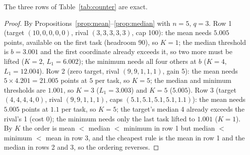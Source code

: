 \begin{proposition}\label{prop:counter}
The three rows of Table~\ref{tab:counter} are exact.
\end{proposition}
\begin{proof}
By Propositions~\ref{prop:mean}--\ref{prop:median} with $n=5$, $q=3$. Row 1 (target $(10,0,0,0,0)$, rival $(3,3,3,3,3)$, cap 100): the mean needs $5.005$ points, available on the first task (headroom 90), so $K=1$; the median threshold is $b=3.001$ and the first coordinate already exceeds it, so two more must be lifted ($K=2$, $L_1=6.002$); the minimum needs all four others at $b$ ($K=4$, $L_1=12.004$). Row 2 (zero target, rival $(9,9,1,1,1)$, gain 5): the mean needs $5\times4.201=21.005$ points at $5$ per task, so $K=5$; the median and minimum thresholds are $1.001$, so $K=3$ ($L_1=3.003$) and $K=5$ ($5.005$). Row 3 (target $(4,4,4,4,0)$, rival $(9,9,1,1,1)$, caps $(5.1,5.1,5.1,5.1,1.1)$): the mean needs $5.005$ points at $1.1$ per task, so $K=5$; the target's median 4 already exceeds the rival's 1 (cost 0); the minimum needs only the last task lifted to $1.001$ ($K=1$). By $K$ the order is mean $<$ median $<$ minimum in row 1 but median $<$ minimum $<$ mean in row 3, and the cheapest rule is the mean in row 1 and the median in rows 2 and 3, so the ordering reverses.
\end{proof}
